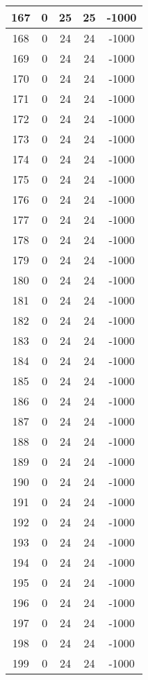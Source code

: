 \documentclass[letterpaper, 12pt]{article}
\begin{document}
\begin{longtable}{|c|c|c|c|c|}
\hline
167 & 0 & 25 & 25 & -1000 \\
\hline
168 & 0 & 24 & 24 & -1000 \\
\hline
169 & 0 & 24 & 24 & -1000 \\
\hline
170 & 0 & 24 & 24 & -1000 \\
\hline
171 & 0 & 24 & 24 & -1000 \\
\hline
172 & 0 & 24 & 24 & -1000 \\
\hline
173 & 0 & 24 & 24 & -1000 \\
\hline
174 & 0 & 24 & 24 & -1000 \\
\hline
175 & 0 & 24 & 24 & -1000 \\
\hline
176 & 0 & 24 & 24 & -1000 \\
\hline
177 & 0 & 24 & 24 & -1000 \\
\hline
178 & 0 & 24 & 24 & -1000 \\
\hline
179 & 0 & 24 & 24 & -1000 \\
\hline
180 & 0 & 24 & 24 & -1000 \\
\hline
181 & 0 & 24 & 24 & -1000 \\
\hline
182 & 0 & 24 & 24 & -1000 \\
\hline
183 & 0 & 24 & 24 & -1000 \\
\hline
184 & 0 & 24 & 24 & -1000 \\
\hline
185 & 0 & 24 & 24 & -1000 \\
\hline
186 & 0 & 24 & 24 & -1000 \\
\hline
187 & 0 & 24 & 24 & -1000 \\
\hline
188 & 0 & 24 & 24 & -1000 \\
\hline
189 & 0 & 24 & 24 & -1000 \\
\hline
190 & 0 & 24 & 24 & -1000 \\
\hline
191 & 0 & 24 & 24 & -1000 \\
\hline
192 & 0 & 24 & 24 & -1000 \\
\hline
193 & 0 & 24 & 24 & -1000 \\
\hline
194 & 0 & 24 & 24 & -1000 \\
\hline
195 & 0 & 24 & 24 & -1000 \\
\hline
196 & 0 & 24 & 24 & -1000 \\
\hline
197 & 0 & 24 & 24 & -1000 \\
\hline
198 & 0 & 24 & 24 & -1000 \\
\hline
199 & 0 & 24 & 24 & -1000 \\
\hline
\end{longtable}
\end{document}
